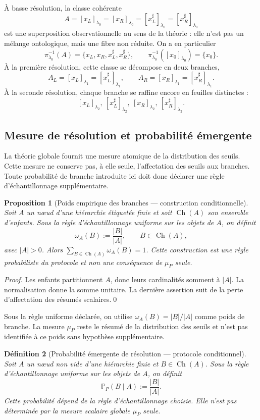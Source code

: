 \documentclass[11pt,a4paper,openany]{book}
\newtheorem{definition}{Définition}[chapter]
\newtheorem{proposition}[definition]{Proposition}
\begin{document}
À basse résolution, la classe cohérente
\[
A=[x_L]_{\lambda_0}=[x_R]_{\lambda_0}=[x_L^\sharp]_{\lambda_0}=[x_R^\sharp]_{\lambda_0}
\]
est une superposition observationnelle au sens de la théorie : elle n'est pas un mélange ontologique, mais une fibre non réduite. On a en particulier
\[
\pi_{\lambda_0}^{-1}(A)=\{x_L,x_R,x_L^\sharp,x_R^\sharp\},
\qquad
\pi_{\lambda_0}^{-1}([x_0]_{\lambda_0})=\{x_0\}.
\]
À la première résolution, cette classe se décompose en deux branches,
\[
A_L=[x_L]_{\lambda_1}=[x_L^\sharp]_{\lambda_1},
\qquad
A_R=[x_R]_{\lambda_1}=[x_R^\sharp]_{\lambda_1}.
\]
À la seconde résolution, chaque branche se raffine encore en feuilles distinctes :
\[
[x_L]_{\lambda_2},\ [x_L^\sharp]_{\lambda_2},\ [x_R]_{\lambda_2},\ [x_R^\sharp]_{\lambda_2}.
\]

\subsection*{Mesure de résolution et probabilité émergente}

La théorie globale fournit une mesure atomique de la distribution des seuils. Cette mesure ne conserve pas, à elle seule, l'affectation des seuils aux branches. Toute probabilité de branche introduite ici doit donc déclarer une règle d'échantillonnage supplémentaire.

\begin{proposition}[Poids empirique des branches — construction conditionnelle]
Soit \(A\) un nœud d'une hiérarchie étiquetée finie et soit \(\operatorname{Ch}(A)\) son ensemble d'enfants. Sous la règle d'échantillonnage uniforme sur les objets de \(A\), on définit
\[
\omega_A(B):=\frac{|B|}{|A|},\qquad B\in\operatorname{Ch}(A),
\]
avec \(|A|>0\). Alors \(\sum_{B\in\operatorname{Ch}(A)}\omega_A(B)=1\). Cette construction est une règle probabiliste du protocole et non une conséquence de \(\mu_P\) seule.
\end{proposition}
\begin{proof}
Les enfants partitionnent \(A\), donc leurs cardinalités somment à \(|A|\). La normalisation donne la somme unitaire. La dernière assertion suit de la perte d'affectation des résumés scalaires.\qed\end{proof}

Sous la règle uniforme déclarée, on utilise \(\omega_A(B)=|B|/|A|\) comme poids de branche. La mesure \(\mu_P\) reste le résumé de la distribution des seuils et n'est pas identifiée à ce poids sans hypothèse supplémentaire.

\begin{definition}[Probabilité émergente de résolution — protocole conditionnel]
Soit \(A\) un nœud non vide d'une hiérarchie finie et \(B\in\operatorname{Ch}(A)\). Sous la règle d'échantillonnage uniforme sur les objets de \(A\), on définit
\[
\mathbb P_P(B\mid A):=\frac{|B|}{|A|}.
\]
Cette probabilité dépend de la règle d'échantillonnage choisie. Elle n'est pas déterminée par la mesure scalaire globale \(\mu_P\) seule.
\end{definition}
\end{document}

